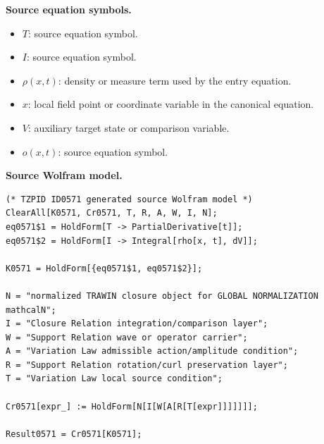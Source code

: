 \begin{minipage}[t]{0.49\linewidth}
\begingroup
\small
\raggedright
\textbf{Source equation symbols.}\par
\begin{itemize}[leftmargin=1.35em,itemsep=1pt,topsep=1pt,parsep=0pt]
    \item $T$: source equation symbol.
    \item $I$: source equation symbol.
    \item $\rho(x,t)$: density or measure term used by the entry equation.
    \item $x$: local field point or coordinate variable in the canonical equation.
    \item $V$: auxiliary target state or comparison variable.
    \item $o(x,t)$: source equation symbol.
\end{itemize}
\endgroup
\end{minipage}\hfill
\begin{minipage}[t]{0.47\linewidth}
\begingroup
\scriptsize
\raggedright
\textbf{Source Wolfram model.}\par
\begin{Verbatim}[fontsize=\tiny,breaklines=true,breakanywhere=true]
(* TZPID ID0571 generated source Wolfram model *)
ClearAll[K0571, Cr0571, T, R, A, W, I, N];
eq0571$1 = HoldForm[T -> PartialDerivative[t]];
eq0571$2 = HoldForm[I -> Integral[rho[x, t], dV]];

K0571 = HoldForm[{eq0571$1, eq0571$2}];

N = "normalized TRAWIN closure object for GLOBAL NORMALIZATION mathcalN";
I = "Closure Relation integration/comparison layer";
W = "Support Relation wave or operator carrier";
A = "Variation Law admissible action/amplitude condition";
R = "Support Relation rotation/curl preservation layer";
T = "Variation Law local source condition";

Cr0571[expr_] := HoldForm[N[I[W[A[R[T[expr]]]]]]];

Result0571 = Cr0571[K0571];
\end{Verbatim}
\endgroup
\end{minipage}

